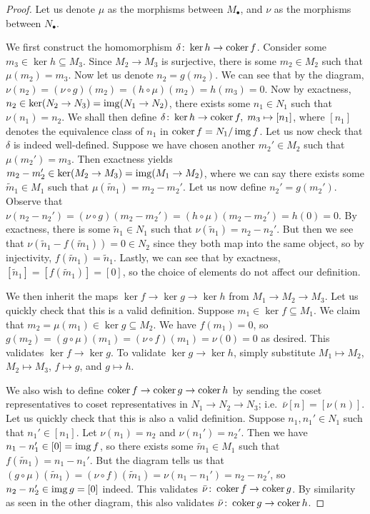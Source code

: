 \begin{proof}
    Let us denote \(\mu\) as the morphisms between \(M_\bullet\),
    and \(\nu\) as the morphisms between \(N_\bullet\).

    We first construct the homomorphism \(\delta\colon\ker h\to\operatorname{coker} f\).
    Consider some \(m_3 \in \ker h \subseteq M_3\).
    Since \(M_2 \to M_3\) is surjective,
    there is some \(m_2 \in M_2\) such that \(\mu(m_2) = m_3\).
    Now let us denote \(n_2 = g(m_2)\).
    We can see that by the diagram,
    \(\nu(n_2) = (\nu\circ g)(m_2) = (h\circ\mu)(m_2) = h(m_3) = 0\).
    Now by exactness, \(n_2 \in \ker(N_2 \to N_3) = \operatorname{img}(N_1 \to N_2)\),
    there exists some \(n_1 \in N_1\) such that \(\nu(n_1) = n_2\).
    We shall then define \(\delta\colon\ker h\to\operatorname{coker} f,\;m_3\mapsto[n_1]\),
    where \([n_1]\) denotes the equivalence class of \(n_1\) in \(\operatorname{coker} f = N_1/\operatorname{img} f\).
    Let us now check that \(\delta\) is indeed well-defined.
    Suppose we have chosen another \(m_2' \in M_2\) such that \(\mu(m_2') = m_3\).
    Then exactness yields \(m_2-m_2' \in \ker(M_2 \to M_3) = \operatorname{img}(M_1 \to M_2)\),
    where we can say there exists some \(\tilde{m}_1 \in M_1\) such that \(\mu(\tilde{m}_1) = m_2-m_2'\).
    Let us now define \(n_2' = g(m_2')\).
    Observe that \(\nu(n_2-n_2') = (\nu\circ g)(m_2-m_2') = (h\circ\mu)(m_2-m_2') = h(0) = 0\).
    By exactness, there is some \(\tilde{n}_1 \in N_1\) such that \(\nu(\tilde{n}_1) = n_2-n_2'\).
    But then we see that \(\nu(\tilde{n}_1-f(\tilde{m}_1)) = 0 \in N_2\)
    since they both map into the same object,
    so by injectivity, \(f(\tilde{m}_1) = \tilde{n}_1\).
    Lastly, we can see that by exactness, \([\tilde{n}_1] = [f(\tilde{m}_1)] = [0]\),
    so the choice of elements do not affect our definition.

    We then inherit the maps \(\ker f \to \ker g \to \ker h\) from \(M_1 \to M_2 \to M_3\).
    Let us quickly check that this is a valid definition.
    Suppose \(m_1 \in \ker f \subseteq M_1\).
    We claim that \(m_2 = \mu(m_1) \in \ker g \subseteq M_2\).
    We have \(f(m_1) = 0\), so \(g(m_2) = (g\circ\mu)(m_1) = (\nu\circ f)(m_1) = \nu(0) = 0\) as desired.
    This validates \(\ker f \to \ker g\).
    To validate \(\ker g \to \ker h\),
    simply substitute \(M_1 \mapsto M_2\), \(M_2 \mapsto M_3\), \(f \mapsto g\), and \(g \mapsto h\).

    We also wish to define \(\operatorname{coker} f \to \operatorname{coker} g \to \operatorname{coker} h\)
    by sending the coset representatives to coset representatives in \(N_1 \to N_2 \to N_3\);
    i.e.\ \(\bar{\nu}[n] = [\nu(n)]\).
    Let us quickly check that this is also a valid definition.
    Suppose \(n_1,n_1' \in N_1\) such that \(n_1' \in [n_1]\).
    Let \(\nu(n_1) = n_2\) and \(\nu(n_1') = n_2'\).
    Then we have \(n_1-n_1' \in [0] = \operatorname{img} f\),
    so there exists some \(\tilde{m}_1 \in M_1\) such that \(f(\tilde{m}_1) = n_1-n_1'\).
    But the diagram tells us that
    \((g\circ\mu)(\tilde{m}_1) = (\nu\circ f)(\tilde{m}_1) = \nu(n_1-n_1') = n_2-n_2'\),
    so \(n_2-n_2' \in \operatorname{img} g = [0]\) indeed.
    This validates \(\bar{\nu}\colon\operatorname{coker} f\to\operatorname{coker} g\).
    By similarity as seen in the other diagram,
    this also validates \(\bar{\nu}\colon\operatorname{coker} g\to\operatorname{coker} h\).


\end{proof}
